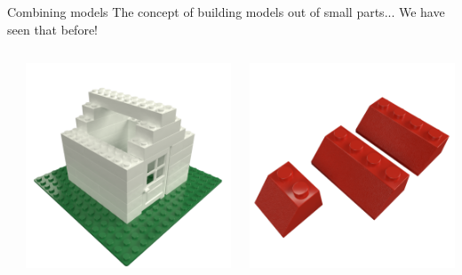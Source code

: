 \begin{frame}{Combining models}
    The concept of building models out of small parts... \pause
    We have seen that before!
    \begin{columns}[c]
        \begin{column}{0.05\textwidth}
        \end{column}\begin{column}{0.35\textwidth}
            \includegraphics[width=\textwidth]{images/03_transformation_framework/lego_house_roofless.png}
        \end{column}\begin{column}{0.2\textwidth}
            \includegraphics[width=\textwidth]{images/03_transformation_framework/lego_roof_pieces.png}

\end{column}
\end{columns}
\end{frame}
